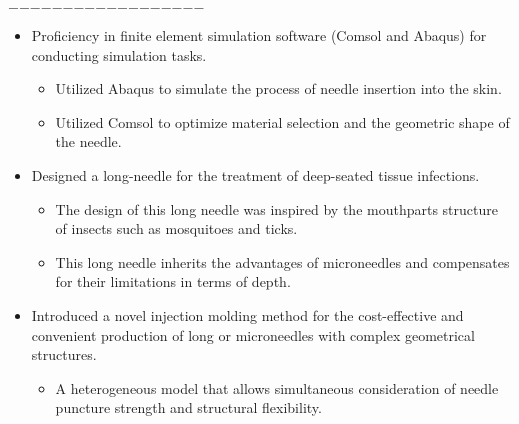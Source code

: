\documentclass{resume}
\begin{document}
    \noindent\hfil$-$\hfil$-$\hfil$-$\hfil$-$\hfil$-$\hfil$-$\hfil$-$\hfil$-$\hfil$-$\hfil$-$\hfil$-$\hfil$-$\hfil$-$\hfil$-$\hfil$-$\hfil$-$\hfil$-$\hfil$-$\hfil

    \begin{itemize}
      \item Proficiency in finite element simulation software (Comsol and Abaqus) for conducting simulation tasks.  \begin{itemize}
        \item Utilized Abaqus to simulate the process of needle insertion into the skin.
        \item Utilized Comsol to optimize material selection and the geometric shape of the needle.
      \end{itemize}
      \item Designed a long-needle for the treatment of deep-seated tissue infections.  \begin{itemize}
        \item The design of this long needle was inspired by the mouthparts structure of insects such as mosquitoes and ticks.
        \item This long needle inherits the advantages of microneedles and compensates for their limitations in terms of depth.
      \end{itemize}
      \item Introduced a novel injection molding method for the cost-effective and convenient production of long or microneedles with complex geometrical structures. \begin{itemize}
        \item A heterogeneous model that allows simultaneous consideration of needle puncture strength and structural flexibility.
      \end{itemize}
    \end{itemize}
\end{document}

